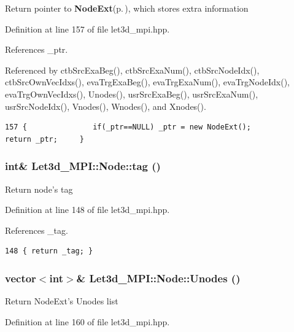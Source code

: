 Return pointer to {\bf Node\-Ext}{\rm (p.\,\pageref{classLet3d__MPI_1_1NodeExt})}, which stores extra information 

Definition at line 157 of file let3d\_\-mpi.hpp.

References \_\-ptr.

Referenced by ctb\-Src\-Exa\-Beg(), ctb\-Src\-Exa\-Num(), ctb\-Src\-Node\-Idx(), ctb\-Src\-Own\-Vec\-Idxs(), eva\-Trg\-Exa\-Beg(), eva\-Trg\-Exa\-Num(), eva\-Trg\-Node\-Idx(), eva\-Trg\-Own\-Vec\-Idxs(), Unodes(), usr\-Src\-Exa\-Beg(), usr\-Src\-Exa\-Num(), usr\-Src\-Node\-Idx(), Vnodes(), Wnodes(), and Xnodes().

\footnotesize\begin{verbatim}157 {               if(_ptr==NULL) _ptr = new NodeExt();            return _ptr;     }
\end{verbatim}\normalsize 


\subsubsection{\setlength{\rightskip}{0pt plus 5cm}int\& Let3d\_\-MPI::Node::tag ()\hspace{0.3cm}{\tt  [inline]}}\label{classLet3d__MPI_1_1Node_58cc1da510029fc48aaa41b18ee51750_58cc1da510029fc48aaa41b18ee51750}


Return node's tag 

Definition at line 148 of file let3d\_\-mpi.hpp.

References \_\-tag.

\footnotesize\begin{verbatim}148 { return _tag; }
\end{verbatim}\normalsize 


\subsubsection{\setlength{\rightskip}{0pt plus 5cm}vector$<$int$>$\& Let3d\_\-MPI::Node::Unodes ()\hspace{0.3cm}{\tt  [inline]}}\label{classLet3d__MPI_1_1Node_b0378ed097e88f4a10757bb0503af35a_b0378ed097e88f4a10757bb0503af35a}


Return Node\-Ext's Unodes list 

Definition at line 160 of file let3d\_\-mpi.hpp.

